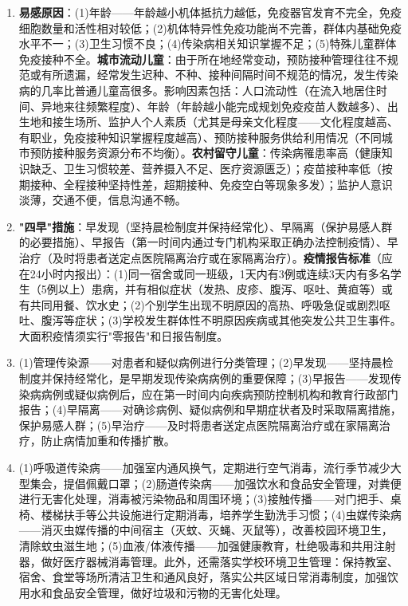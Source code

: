 \begin{enumerate}[leftmargin=*, itemsep=5pt]
    \item \textbf{易感原因}：(1)年龄——年龄越小机体抵抗力越低，免疫器官发育不完全，免疫细胞数量和活性相对较低；(2)机体特异性免疫功能尚不完善，群体内基础免疫水平不一；(3)卫生习惯不良；(4)传染病相关知识掌握不足；(5)特殊儿童群体免疫接种不全。\textbf{城市流动儿童}：由于所在地经常变动，预防接种管理往往不规范或有所遗漏，经常发生迟种、不种、接种间隔时间不规范的情况，发生传染病的几率比普通儿童高很多。影响因素包括：人口流动性（在流入地居住时间、异地来往频繁程度）、年龄（年龄越小能完成规划免疫疫苗人数越多）、出生地和接生场所、监护人个人素质（尤其是母亲文化程度——文化程度越高、有职业，免疫接种知识掌握程度越高）、预防接种服务供给利用情况（不同城市预防接种服务资源分布不均衡）。\textbf{农村留守儿童}：传染病罹患率高（健康知识缺乏、卫生习惯较差、营养摄入不足、医疗资源匮乏）；疫苗接种率低（按期接种、全程接种坚持性差，超期接种、免疫空白等现象多发）；监护人意识淡薄，交通不便，信息沟通不畅。

    \item \textbf{"四早"措施}：早发现（坚持晨检制度并保持经常化）、早隔离（保护易感人群的必要措施）、早报告（第一时间内通过专门机构采取正确办法控制疫情）、早治疗（及时将患者送定点医院隔离治疗或在家隔离治疗）。\textbf{疫情报告标准}（应在24小时内报出）：(1)同一宿舍或同一班级，1天内有3例或连续3天内有多名学生（5例以上）患病，并有相似症状（发热、皮疹、腹泻、呕吐、黄疸等）或有共同用餐、饮水史；(2)个别学生出现不明原因的高热、呼吸急促或剧烈呕吐、腹泻等症状；(3)学校发生群体性不明原因疾病或其他突发公共卫生事件。大面积疫情须实行"零报告"和日报告制度。

    \item (1)管理传染源——对患者和疑似病例进行分类管理；(2)早发现——坚持晨检制度并保持经常化，是早期发现传染病病例的重要保障；(3)早报告——发现传染病病例或疑似病例后，应在第一时间内向疾病预防控制机构和教育行政部门报告；(4)早隔离——对确诊病例、疑似病例和早期症状者及时采取隔离措施，保护易感人群；(5)早治疗——及时将患者送定点医院隔离治疗或在家隔离治疗，防止病情加重和传播扩散。

    \item (1)呼吸道传染病——加强室内通风换气，定期进行空气消毒，流行季节减少大型集会，提倡佩戴口罩；(2)肠道传染病——加强饮水和食品安全管理，对粪便进行无害化处理，消毒被污染物品和周围环境；(3)接触传播——对门把手、桌椅、楼梯扶手等公共设施进行定期消毒，培养学生勤洗手习惯；(4)虫媒传染病——消灭虫媒传播的中间宿主（灭蚊、灭蝇、灭鼠等），改善校园环境卫生，清除蚊虫滋生地；(5)血液/体液传播——加强健康教育，杜绝吸毒和共用注射器，做好医疗器械消毒管理。此外，还需落实学校环境卫生管理：保持教室、宿舍、食堂等场所清洁卫生和通风良好，落实公共区域日常消毒制度，加强饮用水和食品安全管理，做好垃圾和污物的无害化处理。


\end{enumerate}

